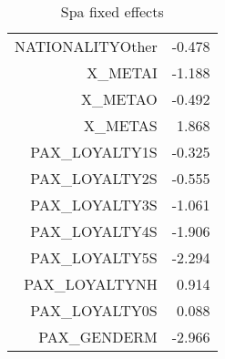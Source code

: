 \documentclass{article}
\begin{document}
\begin{table}[H]
\begin{tabular}{rr}
	NATIONALITYOther	 &                 -0.478        \\          
	X\_METAI	                 &             -1.188            \\      
	X\_METAO	                 &            -0.492             \\     
	X\_METAS	                 &                1.868          \\        
	PAX\_LOYALTY1S    	 &                 -0.325        \\          
	PAX\_LOYALTY2S    	 &                 -0.555        \\          
	PAX\_LOYALTY3S    	 &                 -1.061        \\          
	PAX\_LOYALTY4S    	 &                 -1.906        \\          
	PAX\_LOYALTY5S    	 &                 -2.294        \\          
	PAX\_LOYALTYNH    	 &                 0.914         \\         
	PAX\_LOYALTY0S	         &                 0.088         \\         
	PAX\_GENDERM	         &         -2.966                 \\ 
	\hline 
	\hline 
\end{tabular}
\caption{Spa fixed effects}
\end{table}
\end{document}
